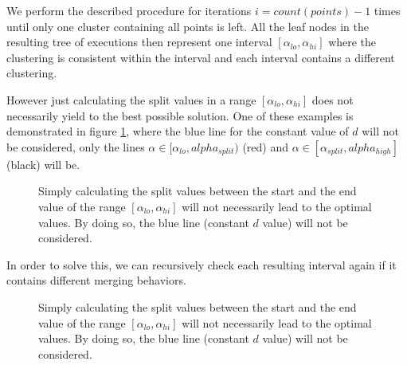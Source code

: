 We perform the described procedure for iterations $i = count(points) -1$ times until only one cluster containing all points is left. All the leaf nodes in the resulting tree of executions then represent one interval $[\alpha_{lo}, \alpha_{hi}]$ where the clustering is consistent within the interval and each interval contains a different clustering.

However just calculating the split values in a range $[\alpha_{lo}, \alpha_{hi}]$ does not necessarily yield to the best possible solution. One of these examples is demonstrated in figure \ref{fig:notoptimal}, where the blue line for the constant value of $d$ will not be considered, only the lines $\alpha \in [\alpha_{lo}, alpha_{split})$ (red) and $\alpha \in [\alpha_{split}, alpha_{high}]$ (black) will be.

\begin{figure}[h]
    \centering
    \caption{Simply calculating the split values between the start and the end value of the range $[\alpha_{lo}, \alpha_{hi}]$ will not necessarily lead to the optimal values. By doing so, the blue line (constant $d$ value) will not be considered.}
    \label{fig:notoptimal}
\end{figure}

In order to solve this, we can recursively check each resulting interval again if it contains different merging behaviors.

\begin{figure}[h]
    \centering
    \caption{Simply calculating the split values between the start and the end value of the range $[\alpha_{lo}, \alpha_{hi}]$ will not necessarily lead to the optimal values. By doing so, the blue line (constant $d$ value) will not be considered.}
    \label{fig:notoptimal2}
\end{figure}

